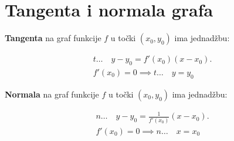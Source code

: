 \section{Tangenta i normala grafa}

\textbf{Tangenta} na graf funkcije $f$ u točki $(x_0,y_0)$ ima jednadžbu:

\begin{gather*}
t\dots\quad y-y_0=f'(x_0)(x-x_0).\\
f'(x_0)=0\implies t\dots\quad y = y_0
\end{gather*}

\noindent
\textbf{Normala} na graf funkcije $f$ u točki $(x_0,y_0)$ ima jednadžbu:

\begin{gather*}
n\dots\quad y-y_0=\frac{1}{f'(x_0)}(x-x_0).\\
f'(x_0)=0\implies n\dots\quad x = x_0
\end{gather*}
